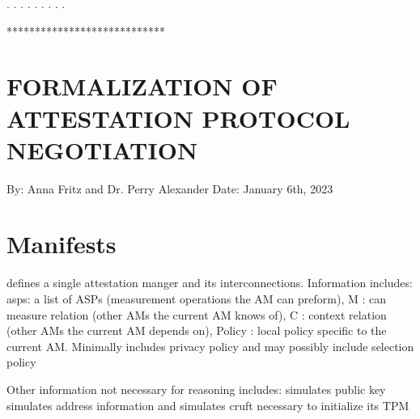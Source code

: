 \documentclass[12pt]{report}
\begin{document}

\begin{coqdoccode}
\coqdocnoindent
{}  .\coqdoceol
\coqdocnoindent
{}  .\coqdoceol
\coqdocnoindent
{}  .\coqdoceol
\coqdocnoindent
{}  .\coqdoceol
\coqdocnoindent
{} .\coqdoceol
\coqdocnoindent
{}  .\coqdoceol
\coqdocnoindent
{}  .\coqdoceol
\coqdocnoindent
{} .\coqdoceol
\coqdocnoindent
{}  .\coqdoceol
\coqdocemptyline
\end{coqdoccode}
****************************
\section{FORMALIZATION OF ATTESTATION PROTOCOL NEGOTIATION}




  By: Anna Fritz and 
      Dr. Perry Alexander 
  Date: January 6th, 2023


\section{Manifests}


     defines a single attestation manger and its interconnections.  
    Information includes: 
  asps:  a list of ASPs (measurement operations the AM can preform),
  M : can measure relation (other AMs the current AM knows of),  
  C : context relation (other AMs the current AM depends on),
  Policy : local policy specific to the current AM.
           Minimally includes privacy policy and may possibly include selection policy   


  Other information not necessary for reasoning includes: 
   simulates public key 
   simulates address information and 
   simulates cruft necessary to initialize its TPM
\end{document}
